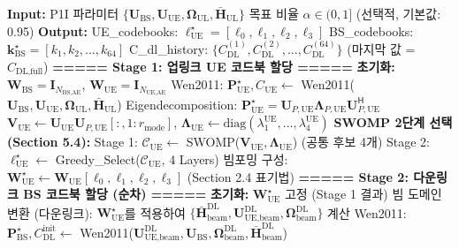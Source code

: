 \documentclass[10pt]{article}
\begin{document}
\begin{algorithm}[H]
\caption{P1P v3: 양방향 SWOMP 코드북 할당 (Stage 1 + Stage 2)}
\begin{algorithmic}[1]
\STATE \textbf{Input:} P1I 파라미터 $\{\mathbf{U}_{\text{BS}}, \mathbf{U}_{\text{UE}}, \boldsymbol{\Omega}_{\text{UL}}, \bar{\mathbf{H}}_{\text{UL}}\}$
\STATE \quad\quad\quad 목표 비율 $\alpha \in (0, 1]$ (선택적, 기본값: 0.95)
\STATE \textbf{Output:}
\STATE \quad UE\_codebooks: $\boldsymbol{\ell}_{\text{UE}}^{\star} = [\ell_0, \ell_1, \ell_2, \ell_3]$
\STATE \quad BS\_codebooks: $\boldsymbol{k}_{\text{BS}}^{\star} = [k_1, k_2, \ldots, k_{64}]$
\STATE \quad C\_dl\_history: $\{C_{\text{DL}}^{(1)}, C_{\text{DL}}^{(2)}, \ldots, C_{\text{DL}}^{(64)}\}$ (마지막 값 = $C_{\text{DL,full}}$)
\STATE
\STATE \textbf{===== Stage 1: 업링크 UE 코드북 할당 =====}
\STATE \textbf{초기화:} $\mathbf{W}_{\text{BS}} = \mathbf{I}_{N_{\text{BS,AE}}}$, $\mathbf{W}_{\text{UE}} = \mathbf{I}_{N_{\text{UE,AE}}}$
\STATE Wen2011: $\mathbf{P}_{\text{UE}}^{\star}, C_{\text{UE}} \gets$ Wen2011($\mathbf{U}_{\text{BS}}, \mathbf{U}_{\text{UE}}, \boldsymbol{\Omega}_{\text{UL}}, \bar{\mathbf{H}}_{\text{UL}}$)
\STATE Eigendecomposition: $\mathbf{P}_{\text{UE}}^{\star} = \mathbf{U}_{P,\text{UE}} \boldsymbol{\Lambda}_{P,\text{UE}} \mathbf{U}_{P,\text{UE}}^{\mathsf{H}}$
\STATE $\mathbf{V}_{\text{UE}} \gets \mathbf{U}_{\text{UE}} \mathbf{U}_{P,\text{UE}}[:, 1:r_{\text{mode}}]$, $\boldsymbol{\Lambda}_{\text{UE}} \gets \text{diag}(\lambda_1^{\text{UE}}, \ldots, \lambda_4^{\text{UE}})$
\STATE \textbf{SWOMP 2단계 선택 (Section 5.4):}
\STATE \quad Stage 1: $\mathcal{C}_{\text{UE}} \gets$ SWOMP($\mathbf{V}_{\text{UE}}, \boldsymbol{\Lambda}_{\text{UE}}$) \quad (공통 후보 4개)
\STATE \quad Stage 2: $\boldsymbol{\ell}_{\text{UE}}^{\star} \gets$ Greedy\_Select($\mathcal{C}_{\text{UE}}$, 4 Layers)
\STATE 빔포밍 구성: $\mathbf{W}_{\text{UE}}^{\star} \gets \mathbf{W}_{\text{UE}}[\ell_0, \ell_1, \ell_2, \ell_3]$ (Section 2.4 표기법)
\STATE
\STATE \textbf{===== Stage 2: 다운링크 BS 코드북 할당 (순차) =====}
\STATE \textbf{초기화:} $\mathbf{W}_{\text{UE}}^{\star}$ 고정 (Stage 1 결과)
\STATE 빔 도메인 변환 (다운링크): $\mathbf{W}_{\text{UE}}^{\star}$를 적용하여 $\{\bar{\mathbf{H}}_{\text{beam}}^{\text{DL}}, \mathbf{U}_{\text{UE,beam}}^{\text{DL}}, \boldsymbol{\Omega}_{\text{beam}}^{\text{DL}}\}$ 계산
\STATE Wen2011: $\mathbf{P}_{\text{BS}}^{\star}, C_{\text{DL}}^{\text{init}} \gets$ Wen2011($\mathbf{U}_{\text{UE,beam}}^{\text{DL}}, \mathbf{U}_{\text{BS}}, \boldsymbol{\Omega}_{\text{beam}}^{\text{DL}}, \bar{\mathbf{H}}_{\text{beam}}^{\text{DL}}$)

\end{algorithmic}
\end{algorithm}
\end{document}
